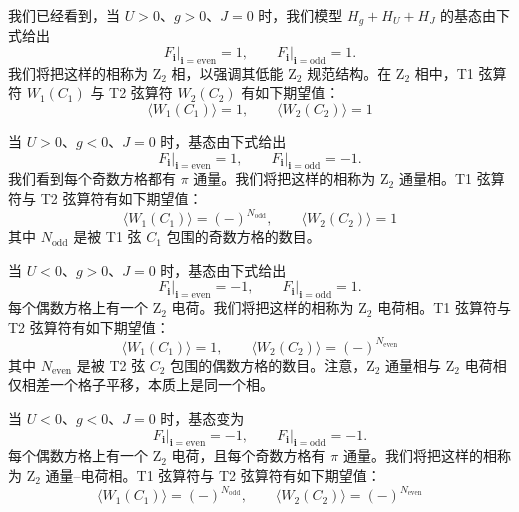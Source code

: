 我们已经看到，当 $U>0$、$g>0$、$J=0$ 时，我们模型 $H_g+H_U+H_J$ 的基态由下式给出
\begin{equation*}
F_{\pmb{i}}\big|_{\pmb{i}=\mathrm{even}}=1,\qquad F_{\pmb{i}}\big|_{\pmb{i}=\mathrm{odd}}=1.
\end{equation*}
我们将把这样的相称为 Z$_2$ 相，以强调其低能 Z$_2$ 规范结构。在 Z$_2$ 相中，T1 弦算符 $W_1(C_1)$ 与 T2 弦算符 $W_2(C_2)$ 有如下期望值：
\begin{equation*}
\langle W_1(C_1)\rangle=1,\qquad \langle W_2(C_2)\rangle=1
\end{equation*}

当 $U>0$、$g<0$、$J=0$ 时，基态由下式给出
\begin{equation*}
F_{\pmb{i}}\big|_{\pmb{i}=\mathrm{even}}=1,\qquad F_{\pmb{i}}\big|_{\pmb{i}=\mathrm{odd}}=-1.
\end{equation*}
我们看到每个奇数方格都有 $\pi$ 通量。我们将把这样的相称为 Z$_2$ 通量相。T1 弦算符与 T2 弦算符有如下期望值：
\begin{equation*}
\langle W_1(C_1)\rangle=(-)^{N_{\mathrm{odd}}},\qquad \langle W_2(C_2)\rangle=1
\end{equation*}
其中 $N_{\mathrm{odd}}$ 是被 T1 弦 $C_1$ 包围的奇数方格的数目。

当 $U<0$、$g>0$、$J=0$ 时，基态由下式给出
\begin{equation*}
F_{\pmb{i}}\big|_{\pmb{i}=\mathrm{even}}=-1,\qquad F_{\pmb{i}}\big|_{\pmb{i}=\mathrm{odd}}=1.
\end{equation*}
每个偶数方格上有一个 Z$_2$ 电荷。我们将把这样的相称为 Z$_2$ 电荷相。T1 弦算符与 T2 弦算符有如下期望值：
\begin{equation*}
\langle W_1(C_1)\rangle=1,\qquad \langle W_2(C_2)\rangle=(-)^{N_{\mathrm{even}}}
\end{equation*}
其中 $N_{\mathrm{even}}$ 是被 T2 弦 $C_2$ 包围的偶数方格的数目。注意，Z$_2$ 通量相与 Z$_2$ 电荷相仅相差一个格子平移，本质上是同一个相。

当 $U<0$、$g<0$、$J=0$ 时，基态变为
\begin{equation*}
F_{\pmb{i}}\big|_{\pmb{i}=\mathrm{even}}=-1,\qquad F_{\pmb{i}}\big|_{\pmb{i}=\mathrm{odd}}=-1.
\end{equation*}
每个偶数方格上有一个 Z$_2$ 电荷，且每个奇数方格有 $\pi$ 通量。我们将把这样的相称为 Z$_2$ 通量--电荷相。T1 弦算符与 T2 弦算符有如下期望值：
\begin{equation*}
\langle W_1(C_1)\rangle=(-)^{N_{\mathrm{odd}}},\qquad \langle W_2(C_2)\rangle=(-)^{N_{\mathrm{even}}}
\end{equation*}

